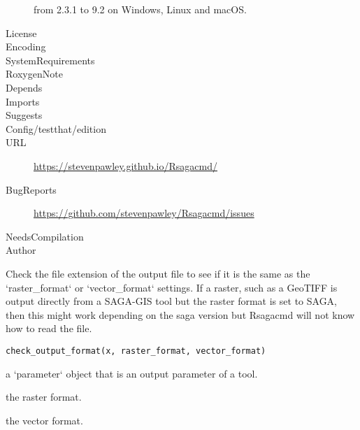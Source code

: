 \documentclass[a4paper]{book}
\begin{document}
\begin{description}
{from 2.3.1 to 9.2 on Windows, Linux and macOS.}
\item[License]
\item[Encoding]
\item[SystemRequirements]
\item[RoxygenNote]
\item[Depends]
\item[Imports]
\item[Suggests]
\item[Config/testthat/edition]
\item[URL]\AsIs{}\url{https://stevenpawley.github.io/Rsagacmd/}\AsIs{}
\item[BugReports]\AsIs{}\url{https://github.com/stevenpawley/Rsagacmd/issues}\AsIs{}
\item[NeedsCompilation]
\item[Author]
\end{description}
%
\begin{Description}
Check the file extension of the output file to see if it is the same as the
`raster\_format` or `vector\_format` settings. If a raster, such as a GeoTIFF
is output directly from a SAGA-GIS tool but the raster format is set to SAGA,
then this might work depending on the saga version but Rsagacmd will not
know how to read the file.
\end{Description}
%
\begin{Usage}
\begin{verbatim}
check_output_format(x, raster_format, vector_format)
\end{verbatim}
\end{Usage}
%
\begin{Arguments}
\begin{ldescription}
\item[\code{x}] a `parameter` object that is an output parameter of a tool.

\item[\code{raster\_format}] the raster format.

\item[\code{vector\_format}] the vector format.
\end{ldescription}
\end{Arguments}
\end{document}

